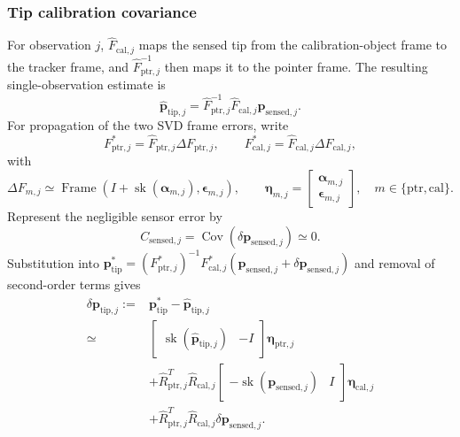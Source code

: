 \documentclass[11pt]{article}
\newcommand{\vct}[1]{\bm{#1}}
\newcommand{\sk}{\operatorname{sk}}
\newcommand{\Cov}{\operatorname{Cov}}
\newcommand{\Frame}{\operatorname{Frame}}
\begin{document}
\subsubsection{Tip calibration covariance}
For observation $j$, $\widehat F_{\mathrm{cal},j}$ maps the sensed tip from
the calibration-object frame to the tracker frame, and
$\widehat F_{\mathrm{ptr},j}^{-1}$ then maps it to the pointer frame.  The
resulting single-observation estimate is
\begin{equation}
\boxed{
\widehat{\vct{p}}_{\mathrm{tip},j}
=
\widehat F_{\mathrm{ptr},j}^{-1}
\widehat F_{\mathrm{cal},j}
\vct{p}_{\mathrm{sensed},j}.}
\end{equation}
For propagation of the two SVD frame errors, write
\begin{equation}
F_{\mathrm{ptr},j}^*
=\widehat F_{\mathrm{ptr},j}\Delta F_{\mathrm{ptr},j},
\qquad
F_{\mathrm{cal},j}^*
=\widehat F_{\mathrm{cal},j}\Delta F_{\mathrm{cal},j},
\end{equation}
with
\begin{equation}
\Delta F_{m,j}
\simeq
\Frame\!\left(I+\sk(\vct{\alpha}_{m,j}),\vct{\epsilon}_{m,j}\right),
\qquad
\vct{\eta}_{m,j}
=
\begin{bmatrix}
\vct{\alpha}_{m,j}\\
\vct{\epsilon}_{m,j}
\end{bmatrix},
\quad m\in\{\mathrm{ptr},\mathrm{cal}\}.
\end{equation}
Represent the negligible sensor error by
\begin{equation}
C_{\mathrm{sensed},j}
=\Cov\!\left(\delta\vct{p}_{\mathrm{sensed},j}\right)\simeq0.
\end{equation}
Substitution into
$\vct{p}_{\mathrm{tip}}^*=(F_{\mathrm{ptr},j}^*)^{-1}
F_{\mathrm{cal},j}^*
(\vct{p}_{\mathrm{sensed},j}+\delta\vct{p}_{\mathrm{sensed},j})$
and removal of
second-order terms gives
\begin{equation}
\boxed{
\begin{aligned}
\delta\vct{p}_{\mathrm{tip},j}
:={}&
\vct{p}_{\mathrm{tip}}^*
-\widehat{\vct{p}}_{\mathrm{tip},j}\\
\simeq{}&
\begin{bmatrix}
\sk(\widehat{\vct{p}}_{\mathrm{tip},j})&-I
\end{bmatrix}
\vct{\eta}_{\mathrm{ptr},j}\\
&+
\widehat R_{\mathrm{ptr},j}^T\widehat R_{\mathrm{cal},j}
\begin{bmatrix}
-\sk(\vct{p}_{\mathrm{sensed},j})&I
\end{bmatrix}
\vct{\eta}_{\mathrm{cal},j}\\
&+
\widehat R_{\mathrm{ptr},j}^T\widehat R_{\mathrm{cal},j}
\delta\vct{p}_{\mathrm{sensed},j}.
\end{aligned}}
\end{equation}
\end{document}

